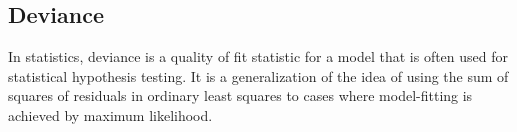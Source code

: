 \documentclass[Main.tex]{subfiles}
\begin{document}
\newpage
\subsection{Deviance}
In statistics, deviance is a quality of fit statistic for a model that is often used for statistical hypothesis testing. It is a generalization of the idea of using the sum of squares of residuals in ordinary least squares to cases where model-fitting is achieved by maximum likelihood.




\end{document}
